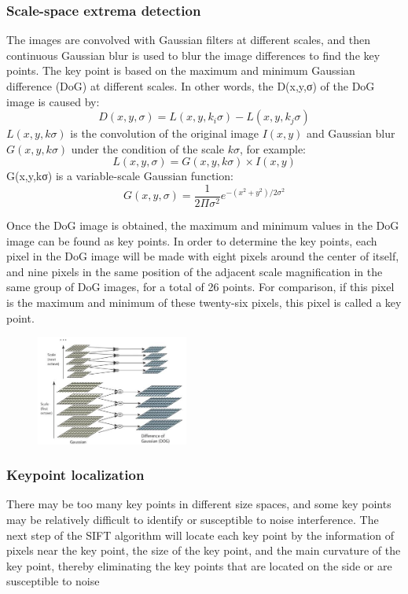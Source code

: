 \documentclass[conference]{IEEEtran}
\begin{document}
\subsubsection{Scale-space extrema detection}The images are convolved with Gaussian filters at different scales, and then continuous Gaussian blur is used to blur the image differences to find the key points. The key point is based on the maximum and minimum Gaussian difference (DoG) at different scales. In other words, the D(x,y,σ) of the DoG image is caused by:\begin{equation}
D(x,y,\sigma)=L(x,y,k_i\sigma)-L(x,y,k_j\sigma)
\end{equation}
$L(x,y,k\sigma)$ is the convolution of the original image $I(x,y)$ and Gaussian blur $G(x,y,k\sigma)$ under the condition of the scale $k\sigma$, for example:
\begin{equation}
L(x,y,\sigma)=G(x,y,k\sigma)\times I(x,y)
\end{equation}
G(x,y,kσ) is a variable-scale Gaussian function:
\begin{equation}
G(x,y,\sigma) = \frac{1}{2\Pi\sigma^2}e^{-(x^2+y^2)/2\sigma^2}
\end{equation}\par
Once the DoG image is obtained, the maximum and minimum values in the DoG image can be found as key points. In order to determine the key points, each pixel in the DoG image will be made with eight pixels around the center of itself, and nine pixels in the same position of the adjacent scale magnification in the same group of DoG images, for a total of 26 points. For comparison, if this pixel is the maximum and minimum of these twenty-six pixels, this pixel is called a key point.
\begin{center}
	\begin{figure}
		\centering
		\includegraphics[width=5cm]{image/sift_dog.jpg}
		\caption{}
	\end{figure}
\end{center}
\subsubsection{Keypoint localization}
There may be too many key points in different size spaces, and some key points may be relatively difficult to identify or susceptible to noise interference. The next step of the SIFT algorithm will locate each key point by the information of pixels near the key point, the size of the key point, and the main curvature of the key point, thereby eliminating the key points that are located on the side or are susceptible to noise
\end{document}
